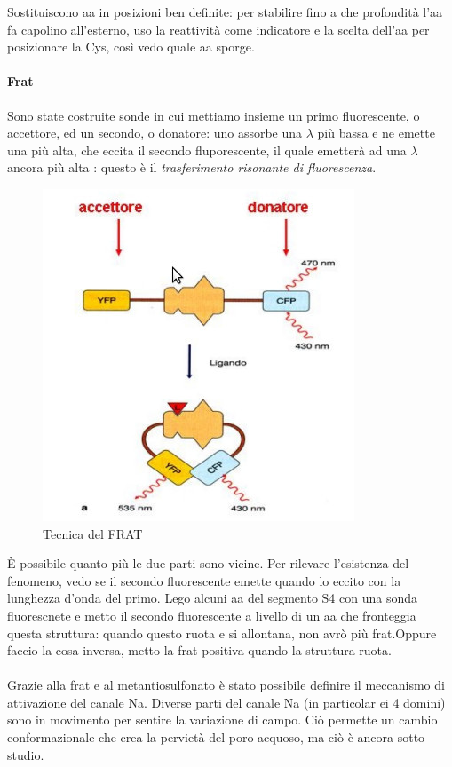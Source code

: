 \documentclass[a4paper,12pt]{article}
\begin{document}
Sostituiscono aa in posizioni ben definite: per stabilire fino a che profondità l'aa fa capolino all'esterno, uso la reattività come indicatore e la scelta dell'aa per posizionare la Cys, così vedo quale aa sporge.

\paragraph{Frat}
Sono state costruite sonde in cui mettiamo insieme un primo fluorescente, o accettore, ed un secondo, o donatore: uno assorbe una $\lambda$ più bassa e ne emette una più alta, che eccita il secondo fluporescente, il quale emetterà ad una $\lambda$ ancora più alta : questo è il \emph{trasferimento risonante di fluorescenza}.

\begin{figure}[H]
\centering
\includegraphics[scale=0.4]{immagine/frat.jpg}
\caption{Tecnica del FRAT}
\label{img:frat}
\end{figure} 

È possibile quanto più le due parti sono vicine. Per rilevare l'esistenza del fenomeno, vedo se il secondo fluorescente emette quando lo eccito con la lunghezza d'onda del primo. Lego alcuni aa del segmento S4 con una sonda fluorescnete e metto il secondo fluorescente a livello di un aa che fronteggia questa struttura: quando questo ruota e si allontana, non avrò più frat.Oppure faccio la cosa inversa, metto la frat positiva quando la struttura ruota.

\paragraph{}
Grazie alla frat e al metantiosulfonato è stato possibile definire il meccanismo di attivazione del canale Na. Diverse parti del canale Na (in particolar ei 4 domini) sono in movimento per sentire la variazione di campo. Ciò permette un cambio conformazionale che crea la pervietà del poro acquoso, ma ciò è ancora sotto studio.
\end{document}
